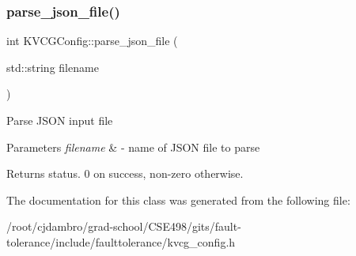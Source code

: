 \subsubsection{\texorpdfstring{parse\+\_\+json\+\_\+file()}{parse\_json\_file()}}
{\footnotesize\ttfamily int K\+V\+C\+G\+Config\+::parse\+\_\+json\+\_\+file (\begin{DoxyParamCaption}\item[{std\+::string}]{filename }\end{DoxyParamCaption})}

Parse J\+S\+ON input file


\begin{DoxyParams}{Parameters}
{\em filename} & -\/ name of J\+S\+ON file to parse\\
\hline
\end{DoxyParams}
\begin{DoxyReturn}{Returns}
status. 0 on success, non-\/zero otherwise. 
\end{DoxyReturn}


The documentation for this class was generated from the following file\+:\begin{DoxyCompactItemize}
\item 
/root/cjdambro/grad-\/school/\+C\+S\+E498/gits/fault-\/tolerance/include/faulttolerance/kvcg\+\_\+config.\+h\end{DoxyCompactItemize}

